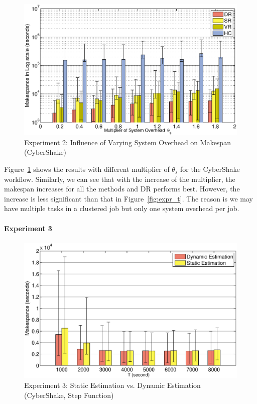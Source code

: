 \documentclass{IOS-Book-Article}
\begin{document}
\begin{figure}[!htb]
\centering
  \includegraphics[width=1\linewidth]{d.eps}
  \caption{Experiment 2: Influence of Varying System Overhead on Makespan (CyberShake)}
  \label{fig:expr_d}
\end{figure}

Figure~\ref{fig:expr_d} shows the results with different multiplier of $\theta_{s}$ for the CyberShake workflow. Similarly, we can see that with the increase of the multiplier, the makespan increases for all the methods and DR performs best. However, the increase is less significant than that in Figure~\ref{fig:expr_t}. The reason is we may have multiple tasks in a clustered job but only one system overhead per job.


\paragraph{\textbf{Experiment 3}}
\begin{figure}[!htb]
\centering
  \includegraphics[width=1\linewidth]{versus.eps}
  \caption{Experiment 3: Static Estimation vs. Dynamic Estimation (CyberShake, Step Function)}
  \label{fig:expr_static_dynamic}
\end{figure}
\end{document}
